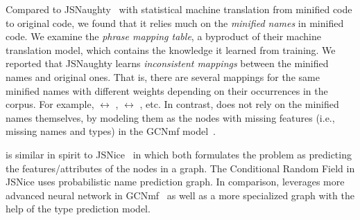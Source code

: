 





Compared to JSNaughty~\cite{JSNaughty2017} with statistical machine
translation from minified code to original code, we found that it
relies much on the {\em minified names} in minified code. We examine
the {\em phrase mapping table}, a byproduct of their machine
translation model, which contains the knowledge it learned from
training. We reported that JSNaughty learns {\em inconsistent
  mappings} between the minified names and original ones. That is,
there are several mappings for the same minified names with different
weights depending on their occurrences in the corpus. For example,
 $\leftrightarrow$ ,  $\leftrightarrow$
, etc. In contrast, {\tool} does not rely on the minified
names themselves, by modeling them as the nodes with
missing features (i.e., missing names and types) in the GCNmf
model~\cite{GCNmf}.

{\tool} is similar in spirit to JSNice~\cite{JSNice2015} in which both
formulates the problem as predicting the features/attributes of the
nodes in a graph. The Conditional Random Field in JSNice uses
probabilistic name prediction graph. In comparison, {\tool} leverages
more advanced neural network in GCNmf~\cite{GCNmf} as well as a more
specialized graph with the help of the type prediction model.







